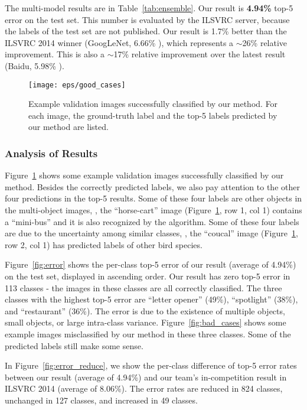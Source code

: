 \documentclass[10pt,twocolumn,letterpaper]{article}
\begin{document}
The multi-model results are in Table~\ref{tab:ensemble}. Our result is \textbf{4.94\%} top-5 error on the test set.
This number is evaluated by the ILSVRC server, because the labels of the test set are not published.
Our result is 1.7\% better than the ILSVRC 2014 winner (GoogLeNet, 6.66\% \cite{Szegedy2014}), which represents a $\sim$26\% relative improvement. This is also a $\sim$17\% relative improvement over the latest result (Baidu, 5.98\% \cite{Wu2015}).

\begin{figure}[t]
\begin{center}
\texttt{[image: eps/good\_cases]}
\end{center}
\caption{Example validation images successfully classified by our method. For each image, the ground-truth label and the top-5 labels predicted by our method are listed.}
\label{fig:good_cases}
\end{figure}

\subsubsection*{Analysis of Results}

Figure~\ref{fig:good_cases} shows some example validation images successfully classified by our method. Besides the correctly predicted labels, we also pay attention to the other four predictions in the top-5 results. Some of these four labels are other objects in the multi-object images, \eg, the ``horse-cart'' image (Figure~\ref{fig:good_cases}, row 1, col 1) contains a ``mini-bus'' and it is also recognized by the algorithm. Some of these four labels are due to the uncertainty among similar classes, \eg, the ``coucal'' image (Figure~\ref{fig:good_cases}, row 2, col 1) has predicted labels of other bird species.

Figure~\ref{fig:error} shows the per-class top-5 error of our result (average of 4.94\%) on the test set, displayed in ascending order. Our result has zero top-5 error in 113 classes - the images in these classes are all correctly classified. The three classes with the highest top-5 error are ``letter opener'' (49\%), ``spotlight'' (38\%), and ``restaurant'' (36\%). The error is due to the existence of multiple objects, small objects, or large intra-class variance. Figure~\ref{fig:bad_cases} shows some example images misclassified by our method in these three classes. Some of the predicted labels still make some sense.

In Figure~\ref{fig:error_reduce}, we show the per-class difference of top-5 error rates between our result (average of 4.94\%) and our team's in-competition result in ILSVRC 2014 (average of 8.06\%). The error rates are reduced in 824 classes, unchanged in 127 classes, and increased in 49 classes.
\end{document}
